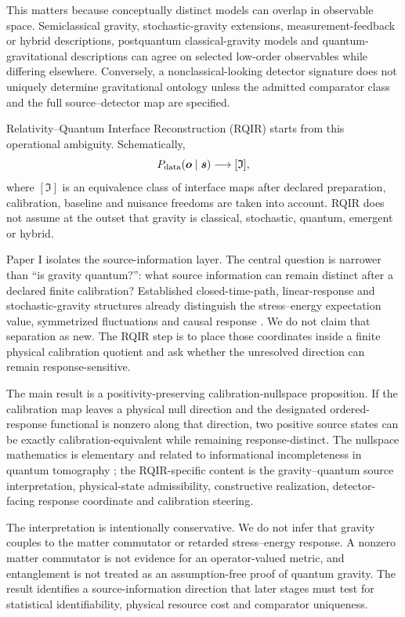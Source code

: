 \documentclass[12pt]{article}
\begin{document}
This matters because conceptually distinct models can overlap in observable space. Semiclassical gravity, stochastic-gravity extensions, measurement-feedback or hybrid descriptions, postquantum classical-gravity models and quantum-gravitational descriptions can agree on selected low-order observables while differing elsewhere. Conversely, a nonclassical-looking detector signature does not uniquely determine gravitational ontology unless the admitted comparator class and the full source--detector map are specified.

Relativity--Quantum Interface Reconstruction (RQIR) starts from this operational ambiguity. Schematically,
\begin{equation}
 P_{\rm data}(\bm{o}\mid\bm{s})\longrightarrow [\mathfrak I],
\end{equation}
where $[\mathfrak I]$ is an equivalence class of interface maps after declared preparation, calibration, baseline and nuisance freedoms are taken into account. RQIR does not assume at the outset that gravity is classical, stochastic, quantum, emergent or hybrid.

Paper I isolates the source-information layer. The central question is narrower than ``is gravity quantum?'': what source information can remain distinct after a declared finite calibration? Established closed-time-path, linear-response and stochastic-gravity structures already distinguish the stress--energy expectation value, symmetrized fluctuations and causal response \cite{FeynmanVernon1963,Keldysh1965,Kubo1957,HuVerdaguer2008}. We do not claim that separation as new. The RQIR step is to place those coordinates inside a finite physical calibration quotient and ask whether the unresolved direction can remain response-sensitive.

The main result is a positivity-preserving calibration-nullspace proposition. If the calibration map leaves a physical null direction and the designated ordered-response functional is nonzero along that direction, two positive source states can be exactly calibration-equivalent while remaining response-distinct. The nullspace mathematics is elementary and related to informational incompleteness in quantum tomography \cite{DArianoParisSacchi2003}; the RQIR-specific content is the gravity--quantum source interpretation, physical-state admissibility, constructive realization, detector-facing response coordinate and calibration steering.

The interpretation is intentionally conservative. We do not infer that gravity couples to the matter commutator or retarded stress--energy response. A nonzero matter commutator is not evidence for an operator-valued metric, and entanglement is not treated as an assumption-free proof of quantum gravity. The result identifies a source-information direction that later stages must test for statistical identifiability, physical resource cost and comparator uniqueness.
\end{document}
